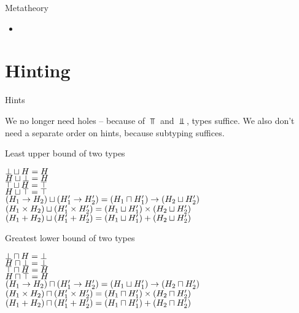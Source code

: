 \documentclass{beamer}
\begin{document}
\begin{frame}{Metatheory}

\begin{itemize}
  \item
\end{itemize}

\end{frame}

\section{Hinting}

\begin{frame}{Hints}

We no longer need holes -- because of $\Top$ and $\Bot$, types suffice. We also don't need a separate order on hints, because subtyping suffices.

\end{frame}

\begin{frame}{Least upper bound of two types}

\begin{center}
  $\bot \sqcup H = H$ \\
  $H \sqcup \bot = H$ \\
  $\top \sqcup H = \top$ \\
  $H \sqcup \top = \top$ \\
  $(H_1 \to H_2) \sqcup (H'_1 \to H'_2) = (H_1 \sqcap H'_1) \to (H_2 \sqcup H'_2)$ \\
  $(H_1 \times H_2) \sqcup (H'_1 \times H'_2) = (H_1 \sqcup H'_1) \times (H_2 \sqcup H'_2)$ \\
  $(H_1 + H_2) \sqcup (H'_1 + H'_2) = (H_1 \sqcup H'_1) + (H_2 \sqcup H'_2)$
\end{center}

\end{frame}

\begin{frame}{Greatest lower bound of two types}

\begin{center}
  $\bot \sqcap H = \bot$ \\
  $H \sqcap \bot = \bot$ \\
  $\top \sqcap H = H$ \\
  $H \sqcap \top = H$ \\
  $(H_1 \to H_2) \sqcap (H'_1 \to H'_2) = (H_1 \sqcup H'_1) \to (H_2 \sqcap H'_2)$ \\
  $(H_1 \times H_2) \sqcap (H'_1 \times H'_2) = (H_1 \sqcap H'_1) \times (H_2 \sqcap H'_2)$ \\
  $(H_1 + H_2) \sqcap (H'_1 + H'_2) = (H_1 \sqcap H'_1) + (H_2 \sqcap H'_2)$
\end{center}

\end{frame}
\end{document}
